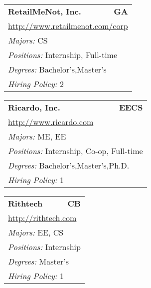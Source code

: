 \documentclass[twoside]{article}
\begin{document}
\begin{center}
\begin{multicols}{3}
\begin{FlushLeft}
\begin{minipage}{.9\columnwidth}
\end{minipage}
 
\begin{minipage}{.9\columnwidth}\begin{tabularx}{.95\columnwidth}{Xr}
                 {\Large\bf RetailMeNot, Inc.} & {\Large\bf GA}\\
    \multicolumn{2}{p{.95\columnwidth}}{\url{http://www.retailmenot.com/corp}}\\
    \multicolumn{2}{p{.95\columnwidth}}{\emph{Majors:} CS}\\
    \multicolumn{2}{p{.95\columnwidth}}{\emph{Positions:} Internship, Full-time}\\
    \multicolumn{2}{p{.95\columnwidth}}{\emph{Degrees:} Bachelor's,Master's}\\
    \multicolumn{2}{p{.95\columnwidth}}{\emph{Hiring Policy:} 2}\\
    \end{tabularx}
    
\end{minipage}
 
\begin{minipage}{.9\columnwidth}\begin{tabularx}{.95\columnwidth}{Xr}
                 {\Large\bf Ricardo, Inc.} & {\Large\bf EECS}\\
    \multicolumn{2}{p{.95\columnwidth}}{\url{http://www.ricardo.com}}\\
    \multicolumn{2}{p{.95\columnwidth}}{\emph{Majors:} ME, EE}\\
    \multicolumn{2}{p{.95\columnwidth}}{\emph{Positions:} Internship, Co-op, Full-time}\\
    \multicolumn{2}{p{.95\columnwidth}}{\emph{Degrees:} Bachelor's,Master's,Ph.D.}\\
    \multicolumn{2}{p{.95\columnwidth}}{\emph{Hiring Policy:} 1}\\
    \end{tabularx}
    
\end{minipage}
 
\begin{minipage}{.9\columnwidth}\begin{tabularx}{.95\columnwidth}{Xr}
                 {\Large\bf Rithtech} & {\Large\bf CB}\\
    \multicolumn{2}{p{.95\columnwidth}}{\url{http://rithtech.com}}\\
    \multicolumn{2}{p{.95\columnwidth}}{\emph{Majors:} EE, CS}\\
    \multicolumn{2}{p{.95\columnwidth}}{\emph{Positions:} Internship}\\
    \multicolumn{2}{p{.95\columnwidth}}{\emph{Degrees:} Master's}\\
    \multicolumn{2}{p{.95\columnwidth}}{\emph{Hiring Policy:} 1}\\
    \end{tabularx}
    

\end{minipage}
\end{FlushLeft}
\end{multicols}
\end{center}
\end{document}
